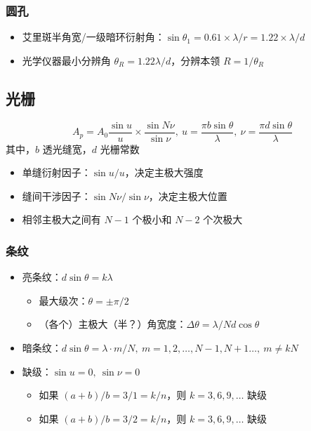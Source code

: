 \documentclass{article}
\begin{document}
\subsubsection{圆孔}

\begin{itemize}
    \item 艾里斑半角宽/一级暗环衍射角：$\sin\theta_1=0.61\times\lambda/r=1.22\times \lambda/d$
    \item 光学仪器最小分辨角 $\theta_R=1.22\lambda/d$，分辨本领 $R=1/\theta_R$
\end{itemize}

\subsection{光栅}

$$
    A_p=A_0\frac{\sin u}{u}\times\frac{\sin N\nu}{\sin \nu},\ u=\frac{\pi b\sin\theta}{\lambda},\ \nu=\frac{\pi d\sin\theta}{\lambda}
$$
其中，$b$ 透光缝宽，$d$ 光栅常数
\begin{itemize}
    \item 单缝衍射因子：$\sin u/u$，决定主极大强度
    \item 缝间干涉因子：$\sin N\nu/\sin \nu$，决定主极大位置
    \item 相邻主极大之间有 $N-1$ 个极小和 $N-2$ 个次极大
\end{itemize}

\subsubsection{条纹}

\begin{itemize}
    \item 亮条纹：$d\sin\theta=k\lambda$ \begin{itemize}
              \item 最大级次：$\theta=\pm\pi/2$
              \item （各个）主极大（半？）角宽度：$\Delta\theta=\lambda/Nd\cos\theta$
          \end{itemize}
    \item 暗条纹：$d\sin\theta=\lambda\cdot m/N,\ m=1,2,\dots,N-1,N+1\dots,\ m\neq kN$
    \item 缺级：$\sin u=0,\ \sin\nu =0$ \begin{itemize}
              \item 如果 $(a+b)/b=3/1=k/n$，则 $k=3,6,9,\dots$ 缺级
              \item 如果 $(a+b)/b=3/2=k/n$，则 $k=3,6,9,\dots$ 缺级
          \end{itemize}
\end{itemize}
\end{document}
